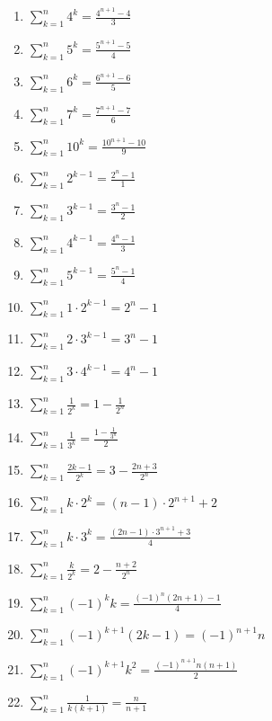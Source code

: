 \documentclass[11pt,a4paper]{article}
\begin{document}
\begin{enumerate}
\item $\displaystyle \sum_{k=1}^{n} 4^{k} = \frac{4^{n + 1} - 4}{3}$
\item $\displaystyle \sum_{k=1}^{n} 5^{k} = \frac{5^{n + 1} - 5}{4}$
\item $\displaystyle \sum_{k=1}^{n} 6^{k} = \frac{6^{n + 1} - 6}{5}$
\item $\displaystyle \sum_{k=1}^{n} 7^{k} = \frac{7^{n + 1} - 7}{6}$
\item $\displaystyle \sum_{k=1}^{n} 10^{k} = \frac{10^{n + 1} - 10}{9}$
\item $\displaystyle \sum_{k=1}^{n} 2^{k - 1} = \frac{2^{n} - 1}{1}$
\item $\displaystyle \sum_{k=1}^{n} 3^{k - 1} = \frac{3^{n} - 1}{2}$
\item $\displaystyle \sum_{k=1}^{n} 4^{k - 1} = \frac{4^{n} - 1}{3}$
\item $\displaystyle \sum_{k=1}^{n} 5^{k - 1} = \frac{5^{n} - 1}{4}$
\item $\displaystyle \sum_{k=1}^{n} 1 \cdot 2^{k - 1} = 2^{n} - 1$
\item $\displaystyle \sum_{k=1}^{n} 2 \cdot 3^{k - 1} = 3^{n} - 1$
\item $\displaystyle \sum_{k=1}^{n} 3 \cdot 4^{k - 1} = 4^{n} - 1$
\item $\displaystyle \sum_{k=1}^{n} \frac{1}{2^{k}} = 1 - \frac{1}{2^{n}}$
\item $\displaystyle \sum_{k=1}^{n} \frac{1}{3^{k}} = \frac{1 - \frac{1}{3^{n}}}{2}$
\item $\displaystyle \sum_{k=1}^{n} \frac{2k - 1}{2^{k}} = 3 - \frac{2n + 3}{2^{n}}$
\item $\displaystyle \sum_{k=1}^{n} k \cdot 2^{k} = \left(n - 1\right) \cdot 2^{n + 1} + 2$
\item $\displaystyle \sum_{k=1}^{n} k \cdot 3^{k} = \frac{\left(2n - 1\right) \cdot 3^{n + 1} + 3}{4}$
\item $\displaystyle \sum_{k=1}^{n} \frac{k}{2^{k}} = 2 - \frac{n + 2}{2^{n}}$
\item $\displaystyle \sum_{k=1}^{n} \left(-1\right)^{k}k = \frac{\left(-1\right)^{n}\left(2n + 1\right) - 1}{4}$
\item $\displaystyle \sum_{k=1}^{n} \left(-1\right)^{k + 1}\left(2k - 1\right) = \left(-1\right)^{n + 1}n$
\item $\displaystyle \sum_{k=1}^{n} \left(-1\right)^{k + 1}k^{2} = \frac{\left(-1\right)^{n + 1}n\left(n + 1\right)}{2}$
\item $\displaystyle \sum_{k=1}^{n} \frac{1}{k\left(k + 1\right)} = \frac{n}{n + 1}$

\end{enumerate}
\end{document}
